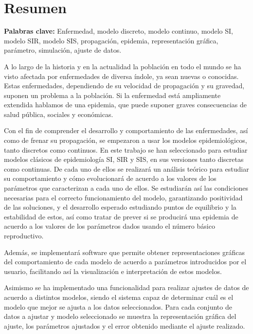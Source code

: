 

\chapter*{Resumen}

\textbf{Palabras clave: } Enfermedad, modelo discreto, modelo continuo, modelo SI, modelo SIR, modelo SIS, propagación, epidemia, representación gráfica, parámetro, simulación, ajuste de datos.

A lo largo de la historia y en la actualidad la población en todo el mundo se ha visto afectada por enfermedades de diversa índole, ya sean nuevas o conocidas. Estas enfermedades, dependiendo de su velocidad de propagación y su gravedad, suponen un problema a la población. Si la enfermedad está ampliamente extendida hablamos de una epidemia, que puede suponer graves consecuencias de salud pública, sociales y económicas.

Con el fin de comprender el desarrollo y comportamiento de las enfermedades, así como de frenar su propagación, se empezaron a usar los modelos epidemiológicos, tanto discretos como continuos. En este trabajo se han seleccionado para estudiar modelos clásicos de epidemiología SI, SIR y SIS, en sus versiones tanto discretas como continuas. De cada uno de ellos se realizará un análisis teórico para estudiar su comportamiento y cómo evolucionará de acuerdo a los valores de los parámetros que caracterizan a cada uno de ellos. Se estudiarán así las condiciones necesarias para el correcto funcionamiento del modelo, garantizando positividad de las soluciones, y el desarrollo esperado estudiando puntos de equilibrio y la estabilidad de estos, así como tratar de prever si se producirá una epidemia de acuerdo a los valores de los parámetros dados usando el número básico reproductivo.

Además, se implementará software que permite obtener representaciones gráficas del comportamiento de cada modelo de acuerdo a parámetros introducidos por el usuario, facilitando así la visualización e interpretación de estos modelos.

Asimismo se ha implementado una funcionalidad para realizar ajustes de datos de acuerdo a distintos modelos, siendo el sistema capaz de determinar cuál es el modelo que mejor se ajusta a los datos seleccionados. Para cada conjunto de datos a ajustar y modelo seleccionado se muestra la representación gráfica del ajuste, los parámetros ajustados y el error obtenido mediante el ajuste realizado.

